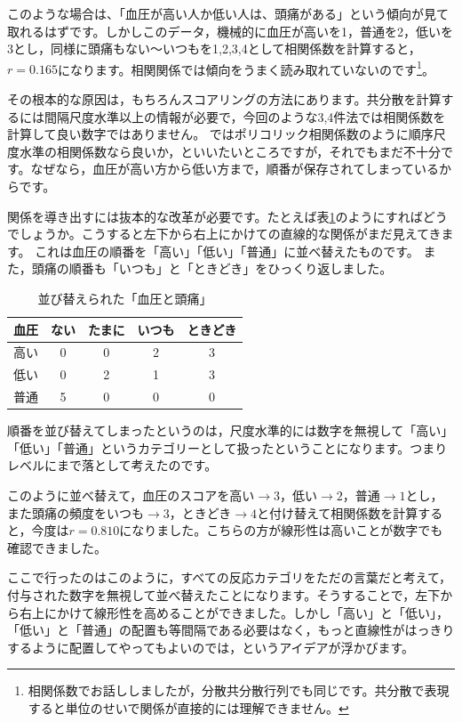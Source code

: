 \documentclass{ltjsbook}
\begin{document}
このような場合は、「血圧が高い人か低い人は、頭痛がある」という傾向が見て取れるはずです。しかしこのデータ，機械的に血圧が高いを1，普通を2，低いを3とし，同様に頭痛もない〜いつもを1,2,3,4として相関係数を計算すると，$r=0.165$になります。相関関係では傾向をうまく読み取れていないのです\footnote{相関係数でお話ししましたが，分散共分散行列でも同じです。共分散で表現すると単位のせいで関係が直接的には理解できません。}。

その根本的な原因は，もちろんスコアリングの方法にあります。共分散を計算するには間隔尺度水準以上の情報が必要で，今回のような3,4件法では相関係数を計算して良い数字ではありません。
ではポリコリック相関係数のように順序尺度水準の相関係数なら良いか，といいたいところですが，それでもまだ不十分です。なぜなら，血圧が高い方から低い方まで，順番が保存されてしまっているからです。

関係を導き出すには抜本的な改革が必要です。たとえば表\ref{tbl::14_02}のようにすればどうでしょうか。こうすると左下から右上にかけての直線的な関係がまだ見えてきます。
これは血圧の順番を「高い」「低い」「普通」に並べ替えたものです。
また，頭痛の順番も「いつも」と「ときどき」をひっくり返しました。
\begin{table}[ht]
	\begin{center}
		\caption{並び替えられた「血圧と頭痛」}
		\begin{tabular}{c|cccc}
			血圧 & ない & たまに & いつも & ときどき \\
			\hline
			高い & 0  & 0   & 2   & 3    \\
			低い & 0  & 2   & 1   & 3    \\
			普通 & 5  & 0   & 0   & 0    \\
		\end{tabular}
		\label{tbl::14_02}
	\end{center}
\end{table}
順番を並び替えてしまったというのは，尺度水準的には数字を無視して「高い」「低い」「普通」というカテゴリーとして扱ったということになります。つまりレベルにまで落として考えたのです。

このように並べ替えて，血圧のスコアを高い$\to3$，低い$\to2$，普通$\to1$とし，また頭痛の頻度をいつも$\to3$，ときどき$\to4$と付け替えて相関係数を計算すると，今度は$r=0.810$になりました。こちらの方が線形性は高いことが数字でも確認できました。

ここで行ったのはこのように，すべての反応カテゴリをただの言葉だと考えて，付与された数字を無視して並べ替えたことになります。そうすることで，左下から右上にかけて線形性を高めることができました。しかし「高い」と「低い」，「低い」と「普通」の配置も等間隔である必要はなく，もっと直線性がはっきりするように配置してやってもよいのでは，というアイデアが浮かびます。
\end{document}
